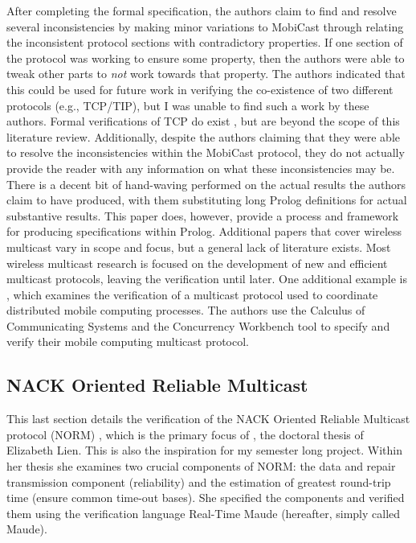 \documentclass[10pt, journal]{IEEEtran}
\begin{document}
\bigbreak
After completing the formal specification, the authors claim to find and resolve several inconsistencies by making minor variations to MobiCast through relating the inconsistent protocol sections with contradictory properties. If one section of the protocol was working to ensure some property, then the authors were able to tweak other parts to \textit{not} work towards that property. The authors indicated that this could be used for future work in verifying the co-existence of two different protocols (e.g., TCP/TIP), but I was unable to find such a work by these authors. Formal verifications of TCP do exist \cite{Smith1997}, but are beyond the scope of this literature review. Additionally, despite the authors claiming that they were able to resolve the inconsistencies within the MobiCast protocol, they do not actually provide the reader with any information on what these inconsistencies may be. There is a decent bit of hand-waving performed on the actual results the authors claim to have produced, with them substituting long Prolog definitions for actual substantive results. This paper does, however, provide a process and framework for producing specifications within Prolog.
\bigbreak
Additional papers that cover wireless multicast vary in scope and focus, but a general lack of literature exists. Most wireless multicast research is focused on the development of new and efficient multicast protocols, leaving the verification until later. One additional example is \cite{Anastasi2000}, which examines the verification of a multicast protocol used to coordinate distributed mobile computing processes. The authors use the Calculus of Communicating Systems \cite{Milner1989} and the Concurrency Workbench tool \cite{Cleaveland1996} to specify and verify their mobile computing multicast protocol. 
\bigbreak
\subsection{NACK Oriented Reliable Multicast}
This last section details the verification of the NACK Oriented Reliable Multicast protocol (NORM) \cite{rfc5740}, which is the primary focus of \cite{Lien2004FormalMA}, the doctoral thesis of Elizabeth Lien. This is also the inspiration for my semester long project. Within her thesis she examines two crucial components of NORM: the data and repair transmission component (reliability) and the estimation of greatest round-trip time (ensure common time-out bases). She specified the components and verified them using the verification language Real-Time Maude (hereafter, simply called Maude).
\bigbreak
\end{document}
